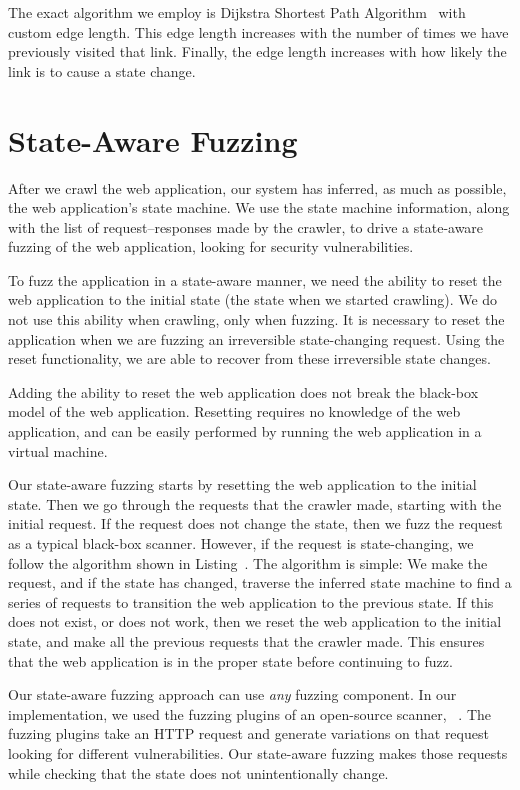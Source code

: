 The exact algorithm we employ is Dijkstra Shortest Path
Algorithm~\cite{dijkstra59:shortestpath} with custom edge length. This edge
length increases with the number of times we have previously visited that link.
Finally, the edge length increases with how likely the link is to cause a state
change.

\section{State-Aware Fuzzing}


After we crawl the web application, our system has inferred, as much as
possible, the web application's state machine. We use the state machine
information, along with the list of request--responses made by the crawler, to
drive a state-aware fuzzing of the web application, looking for security
vulnerabilities.

To fuzz the application in a state-aware manner, we need the ability to reset
the web application to the initial state (the state when we started crawling).
We do not use this ability when crawling, only when fuzzing. It is necessary to
reset the application when we are fuzzing an irreversible state-changing
request. Using the reset functionality, we are able to recover from these
irreversible state changes.

Adding the ability to reset the web application does not break the black-box
model of the web application. Resetting requires no knowledge of the web
application, and can be easily performed by running the web application in a
virtual machine.

Our state-aware fuzzing starts by resetting the web application to the initial
state. Then we go through the requests that the crawler made, starting with the
initial request. If the request does not change the state, then we fuzz the
request as a typical black-box scanner.
However, if the request is state-changing, we follow the algorithm shown in
Listing~. The algorithm is simple: We make the
request, and if the state has changed, traverse the inferred state machine to
find a series of requests to transition the web application to the previous
state. If this does not exist, or does not work, then we reset the web
application to the initial state, and make all the previous requests that the
crawler made. This ensures that the web application is in the proper state
before continuing to fuzz.

Our state-aware fuzzing approach can use \emph{any} fuzzing component. In our
implementation, we used the fuzzing plugins of an open-source scanner, \waf{}~\cite{w3af}.
The fuzzing plugins take an HTTP request and generate variations on that request
looking for different vulnerabilities. Our state-aware fuzzing makes those
requests while checking that the state does not unintentionally change.

